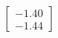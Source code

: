 \documentclass[preview]{standalone}
\begin{document}
\begin{align*}
\begin{bmatrix} -1.40 \\ -1.44 \end{bmatrix}
\end{align*}
\end{document}
